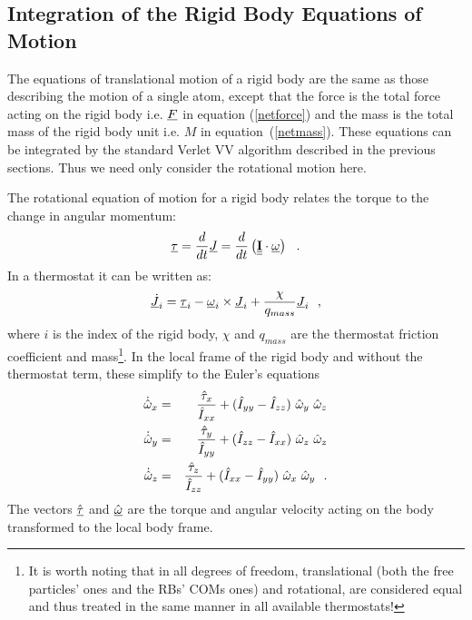 \subsection{Integration of the Rigid Body Equations of Motion}

The equations of translational motion of a rigid body are the same as
those describing the motion of a single atom, except that the force is
the total force acting on the rigid body i.e. $\mbox{$\underline{F}$}$ in equation
(\ref{netforce}) and the mass is the total mass of the rigid body unit
i.e. $M$ in equation~(\ref{netmass}).  These equations can be integrated
by the standard Verlet VV algorithm described in the previous
sections.  Thus we need only consider the rotational motion here.

The rotational equation of motion for a rigid body relates the torque to the change in angular momentum:
\begin{equation}
\mbox{$\underline{\tau}$} = {d \over dt}\mbox{$\underline{J}$} ={d \over dt}\left(\mbox{$\underline{\underline{\bf I}}$} \cdot \mbox{$\underline{\omega}$}\right)~~.\label{torquemotion}
\end{equation}
In a thermostat it can be written as:
\begin{equation}
\dot{\mbox{$\underline{J}$}_{i}} = \mbox{$\underline{\tau}$}_{i} - \mbox{$\underline{\omega}$}_{i} \times \mbox{$\underline{J}$}_{i} + \frac{\chi}{q_{mass}} \mbox{$\underline{J}$}_{i}~~,
\end{equation}
where $i$ is the index of the rigid body, $\chi$ and ${q_{mass}}$ are
the thermostat friction coefficient and mass\footnote{It is worth noting that
in \D all degrees of freedom, translational (both the free particles' ones and
the RBs' COMs ones) and rotational, are considered equal and thus treated in
the same manner in all available thermostats!}.  In the local frame of the
rigid body and without the thermostat term, these simplify to the Euler's
equations
\begin{eqnarray}
\dot{\hat{\omega}}_{x} &=&
{\hat{\tau}_{x} \over \hat{I}_{xx}}+(\hat{I}_{yy}-\hat{I}_{zz})~\hat{\omega}_{y}~\hat{\omega}_{z} \nonumber \\
\dot{\hat{\omega}}_{y} &=&
{\hat{\tau}_{y}\over \hat{I}_{yy}}+(\hat{I}_{zz}-\hat{I}_{xx})~\hat{\omega}_{z}~\hat{\omega}_{z} \label{euler} \\
\dot{\hat{\omega}}_{z} &=&
{\hat{\tau}_{z}\over \hat{I}_{zz}}+(\hat{I}_{xx}-\hat{I}_{yy})~\hat{\omega}_{x}~\hat{\omega}_{y}~~. \nonumber
\end{eqnarray}
The vectors $\hat{\mbox{$\underline{\tau}$}}$ and $\hat{\mbox{$\underline{\omega}$}}$ are the torque and
angular velocity acting on the body transformed to the local body frame.
